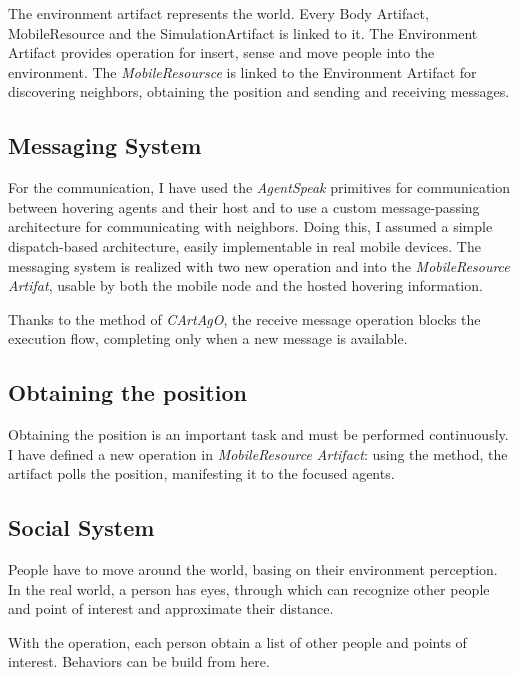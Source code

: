 The environment artifact represents the world. Every Body Artifact,
MobileResource and the SimulationArtifact is linked to it. The Environment
Artifact provides operation for insert, sense and move people into the
environment. The \emph{MobileResoursce} is linked to the Environment Artifact
for discovering neighbors, obtaining the position and sending and receiving
messages.

\subsection{Messaging System}

For the communication, I have used the \emph{AgentSpeak} primitives
for communication between hovering agents and their host and to use a custom
message-passing architecture for communicating with neighbors. Doing this, I
assumed a simple dispatch-based architecture, easily implementable in real
mobile devices. The messaging system is realized with two new operation
 and  into the \emph{MobileResource
Artifat}, usable by both the mobile node and the hosted hovering information.

Thanks to the  method of \emph{CArtAgO}, the receive message
operation blocks the execution flow, completing only when a new message is
available.

\subsection{Obtaining the position}

Obtaining the position is an important task and must be performed continuously.
I have defined a new operation  in
\emph{MobileResource Artifact}: using the  method, the artifact
polls the position, manifesting it to the focused agents.


\subsection{Social System}

People have to move around the world, basing on their environment perception.
In the real world, a person has eyes, through which can recognize other people
and point of interest and approximate their distance.

With the  operation, each person obtain a list of other people and
points of interest. Behaviors can be build from here.

